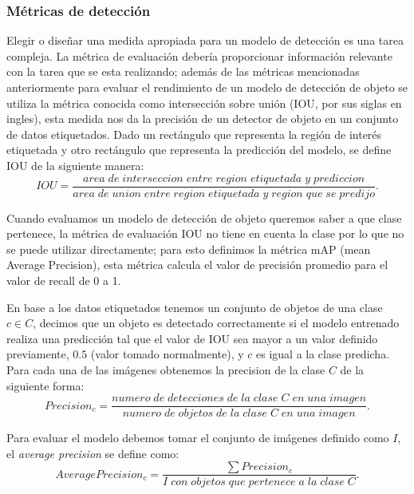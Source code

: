 \subsubsection*{Métricas de detección}\label{sub:metricas_de_deteccion}
Elegir o diseñar una medida apropiada para un modelo de detección es una tarea compleja. La métrica de evaluación debería proporcionar información relevante con la tarea que se esta realizando; además de las métricas mencionadas anteriormente para evaluar el rendimiento de un modelo de detección de objeto se utiliza la métrica conocida como intersección sobre unión (IOU, por sus siglas en ingles), esta medida nos da la precisión de un detector de objeto en un conjunto de datos etiquetados. Dado un rectángulo que representa la región de interés etiquetada y otro rectángulo que representa la predicción del modelo, se define IOU de la siguiente manera:
\begin{equation}
IOU = \frac{area\;de\;interseccion\;entre\;region\;etiquetada\;y\;prediccion}{area\;de\;union\;entre\;region\;etiquetada\;y\;region\;que\;se\;predijo}.
\end{equation}

Cuando evaluamos un modelo de detección de objeto queremos saber a que clase pertenece, la métrica de evaluación IOU no tiene en cuenta la clase por lo que no se puede utilizar directamente; para esto definimos la métrica mAP (mean Average Precision), esta métrica calcula el valor de precisión promedio para el valor de recall de 0 a 1.

En base a los datos etiquetados tenemos un conjunto de objetos de una clase $c \in C$, decimos que un objeto es detectado correctamente si el modelo entrenado realiza una predicción tal que el valor de IOU sea mayor a un valor definido previamente, $0.5$ (valor tomado normalmente), y $c$ es igual a la clase predicha. Para cada una de las imágenes obtenemos la precision de la clase $C$ de la siguiente forma:
\begin{equation}
Precision_c = \frac{numero\;de\;detecciones\;de\;la\;clase\;C\;en\;una\;imagen}{numero\;de\;objetos\;de\;la\;clase\;C\;en\;una\;imagen}.
\end{equation}

Para evaluar el modelo debemos tomar el conjunto de imágenes definido como $I$, el \textit{average precision} se define como:
\begin{equation}
Average Precision_c = \frac{\sum Precision_c}{I\;con\;objetos\;que\;pertenece\;a\;la\;clase\;C}.
\end{equation}



